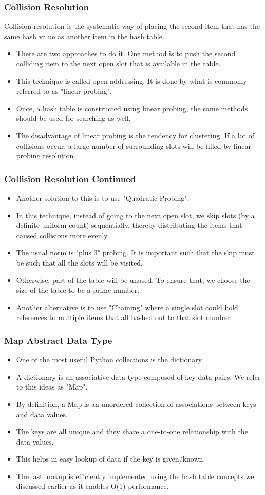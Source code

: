 \documentclass{beamer}
\begin{document}
\begin{frame}
\frametitle{Collision Resolution}
Collision resolution is the systematic  way of placing the second item that has the same hash value as another item in the hash table. 
\begin{itemize}
\item There are two approaches to do it. One method is to push the second colliding item to the next open slot that is available in the table.
\item This technique is called open addressing. It is done by what is commonly referred to as "linear probing".
\item Once, a hash table is constructed using linear probing, the same methods should be used for searching as well.
\item The disadvantage of linear probing is the tendency for clustering. If a lot of collisions occur, a large number of surrounding slots will be filled by linear probing resolution.
\end{itemize}
\end{frame}

\begin{frame}
\frametitle{Collision Resolution Continued}
\begin{itemize}
\item Another solution to this is to use "Quadratic Probing".
\item In this technique, instead of going to the next open slot, we skip slots (by a definite uniform count) sequentially, thereby distributing the items that caused collisions more evenly.
\item The usual norm is "plus 3" probing. It is important such that the skip must be such that all the slots will be visited.
\item Otherwise, part of the table will be unused. To ensure that, we choose the size of the table to be a prime number.
\item Another alternative is to use "Chaining" where a single slot could hold references to multiple items that all hashed out to that slot number.
\end{itemize}
\end{frame}

\begin{frame}
\frametitle{Map Abstract Data Type}
\begin{itemize}
\item One of the most useful Python collections is the dictionary. 
\item A dictionary is an associative
data type composed of key-data pairs. We refer to this ideas as "Map".
\item By definition, a Map is an unordered collection of associations between keys and data values.
\item The keys are all unique and they share a one-to-one relationship with the data values.
\item This helps in easy lookup of data if the key is given/known.
\item The fast lookup is efficiently implemented using the hash table concepts we discussed earlier as it enables O(1) performance.
\end{itemize}
\end{frame}
\end{document}
